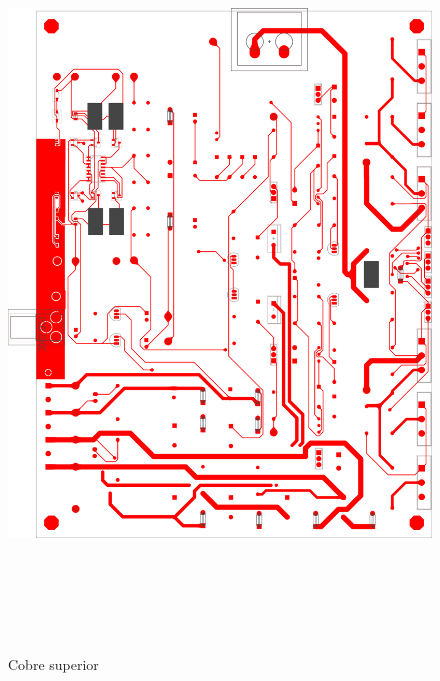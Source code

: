 \begin{figure}[H]
    \centering
    \includegraphics[height=200mm, angle=0]{img/PCB/layers/amplifier/top-copper.png}
    \caption{\footnotesize{Cobre superior}}
    \label{fig:pcb_amp_top_copper}
\end{figure}

\clearpage

